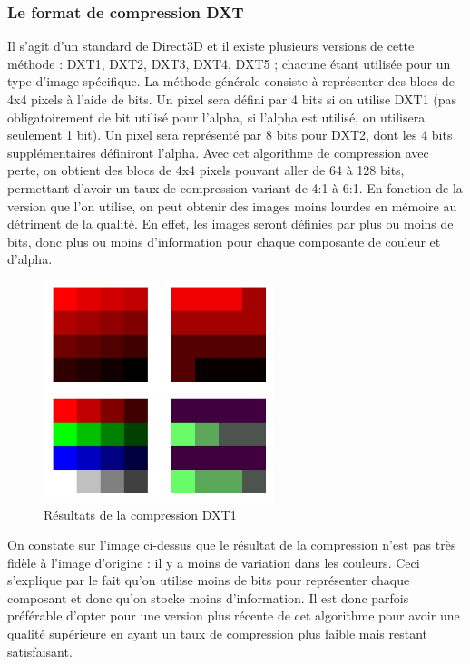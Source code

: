 \documentclass[a4paper, 12pt]{article} %
\begin{document}
\subsubsection{Le format de compression DXT}
Il s'agit d'un standard de Direct3D et il existe plusieurs versions de cette méthode : DXT1, DXT2, DXT3, DXT4, DXT5 ; chacune étant utilisée pour un type d'image spécifique. La méthode générale consiste à représenter des blocs de 4x4 pixels à l'aide de bits. Un pixel sera défini par 4 bits si on utilise DXT1 (pas obligatoirement de bit utilisé pour l'alpha, si l'alpha est utilisé, on utilisera seulement 1 bit). Un pixel sera représenté par 8 bits pour DXT2, dont les 4 bits supplémentaires définiront l'alpha. Avec cet algorithme de compression avec perte, on obtient des blocs de 4x4 pixels pouvant aller de 64 à 128 bits, permettant d'avoir un taux de compression variant de 4:1 à 6:1. En fonction de la version que l'on utilise, on peut obtenir des images moins lourdes en mémoire au détriment de la qualité. En effet, les images seront définies par plus ou moins de bits, donc plus ou moins d'information pour chaque composante de couleur et d'alpha.

\begin{figure}[!h]%
	\begin{center}
	\includegraphics[width=0.60\textwidth]{images/texture_dxt.png}%
	\caption{Résultats de la compression DXT1}%
	\label{}%
	\end{center}
\end{figure}

\newpage

On constate sur l'image ci-dessus que le résultat de la compression n'est pas très fidèle à l'image d'origine : il y a moins de variation dans les couleurs. Ceci s'explique par le fait qu'on utilise moins de bits pour représenter chaque composant et donc qu'on stocke moins d'information. Il est donc parfois préférable d'opter pour une version plus récente de cet algorithme pour avoir une qualité supérieure en ayant un taux de compression plus faible mais restant satisfaisant.
\end{document}
